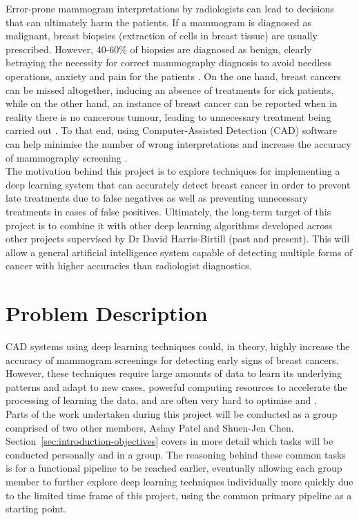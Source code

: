 Error-prone mammogram interpretations by radiologists can lead to decisions that can ultimately harm the patients. If a mammogram is diagnosed as malignant, breast biopsies (extraction of cells in breast tissue) are usually prescribed. However, 40-60\% of biopsies are diagnosed as benign, clearly betraying the necessity for correct mammography diagnosis to avoid needless operations, anxiety and pain for the patients \citep{Hepsag2017}. On the one hand, breast cancers can be missed altogether, inducing an absence of treatments for sick patients, while on the other hand, an instance of breast cancer can be reported when in reality there is no cancerous tumour, leading to unnecessary treatment being carried out \citep{Elter2009}. To that end, using Computer-Assisted Detection (CAD) software can help minimise the number of wrong interpretations and increase the accuracy of mammography screening \citep{Shen2017}.\\

The motivation behind this project is to explore techniques for implementing a deep learning system that can accurately detect breast cancer in order to prevent late treatments due to false negatives as well as preventing unnecessary treatments in cases of false positives. Ultimately, the long-term target of this project is to combine it with other deep learning algorithms developed across other projects supervised by Dr David Harris-Birtill (past and present). This will allow a general artificial intelligence system capable of detecting multiple forms of cancer with higher accuracies than radiologist diagnostics.\\


\section{Problem Description}
\label{sec:problem-description}

CAD systems using deep learning techniques could, in theory, highly increase the accuracy of mammogram screenings for detecting early signs of breast cancers. However, these techniques require large amounts of data to learn its underlying patterns and adapt to new cases, powerful computing resources to accelerate the processing of learning the data, and are often very hard to optimise and .\\

Parts of the work undertaken during this project will be conducted as a group comprised of two other members, Ashay Patel and Shuen-Jen Chen. Section~\ref{sec:introduction-objectives} covers in more detail which tasks will be conducted personally and in a group. The reasoning behind these common tasks is for a functional pipeline to be reached earlier, eventually allowing each group member to further explore deep learning techniques individually more quickly due to the limited time frame of this project, using the common primary pipeline as a starting point.

